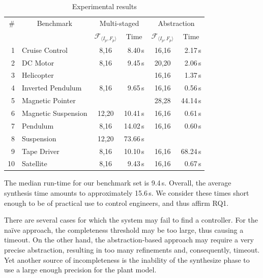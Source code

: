 \documentclass[runningheads,a4paper]{llncs}
\newcommand{\xmark}{\ding{55}}
\begin{document}
\begin{table}
\centering
\begin{tabular}{| r | l | c | r | c | r |}
%
\hline
\# & \multicolumn{1}{|c|}{Benchmark}  & \multicolumn{2}{|c|}{Multi-staged}                 & \multicolumn{2}{|c|}{Abstraction} \\
   &                                  & \multicolumn{1}{|c|}{$\mathcal{F}_{\langle I_p,F_p \rangle}$} & \multicolumn{1}{|c|}{Time} & \multicolumn{1}{|c|}{$\mathcal{F}_{\langle I_p,F_p \rangle}$} & \multicolumn{1}{|c|}{Time} \\\hline
1  & Cruise Control      & 8,16   & 8.40\,s & 16,16  &   2.17\,s \\
2  & DC Motor            & 8,16   & 9.45\,s & 20,20  &   2.06\,s \\
3  & Helicopter          & \xmark & \xmark  & 16,16  &   1.37\,s \\
4  & Inverted Pendulum   & 8,16   & 9.65\,s & 16,16  &   0.56\,s \\
5  & Magnetic Pointer    & \xmark & \xmark  & 28,28  &  44.14\,s \\
6  & Magnetic Suspension & 12,20  &10.41\,s & 16,16  &   0.61\,s \\
7  & Pendulum            & 8,16   &14.02\,s & 16,16  &   0.60\,s \\
8  & Suspension          & 12,20  &73.66\,s & \xmark &    \xmark \\
9  & Tape Driver         & 8,16   &10.10\,s & 16,16  &  68.24\,s \\
10 & Satellite           & 8,16   & 9.43\,s & 16,16  &   0.67\,s \\\hline
%
\end{tabular}
\caption{Experimental results\label{tab:results}}
\end{table}



The median run-time for our benchmark set is 9.4\,s.  Overall, the average
synthesis time amounts to approximately 15.6\,s.  We consider these times
short enough to be of practical use to control engineers, and thus affirm
RQ1.

There are several cases for which the system may fail to find a controller. 
For the na\"ive approach, the completeness threshold may be too large, thus
causing a timeout.  On the other hand, the abstraction-based approach may
require a very precise abstraction, resulting in too many refinements and,
consequently, timeout.  Yet another source of incompleteness is the
inability of the {\sc synthesize} phase to use a large enough precision for
the plant model.
\end{document}
